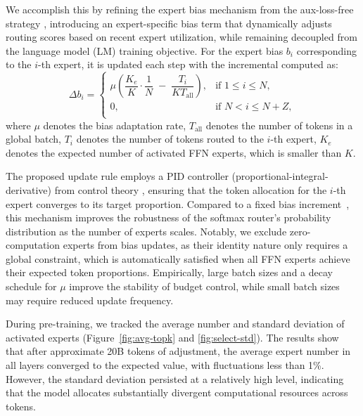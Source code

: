 \documentclass{article}
\begin{document}
We accomplish this by refining the expert bias mechanism from the aux-loss-free strategy \citep{wang2024auxiliary}, introducing an expert-specific bias term that dynamically adjusts routing scores based on recent expert utilization, while remaining decoupled from the language model (LM) training objective. 
For the expert bias $b_i$ corresponding to the $i$-th expert, it is updated each step with the incremental computed as:
\begin{equation}
\label{eq:bias}
    \Delta b_i =
    \begin{cases}
        \mu \left( \dfrac{K_{e}}{K} \cdot \dfrac{1}{N} \;-\; \dfrac{T_i}{KT_{\mathrm{all}}} \right), & \text{if } 1 \leq i \leq N, \\[1.2ex]
        0, & \text{if } N < i \leq N+Z,  \\
    \end{cases}
\end{equation}
where $\mu$ denotes the bias adaptation rate, $T_{\mathrm{all}}$ denotes the  number of tokens in a global batch, $T_i$ denotes the number of tokens routed to the $i$-th expert, $K_{e}$ denotes the expected number of activated FFN experts, which is smaller than $K$.

The proposed update rule employs a PID controller (proportional-integral-derivative) from control theory \citep{control_book}, ensuring that the token allocation for the $i$-th expert converges to its target proportion. Compared to a fixed bias increment~\citep{wang2024auxiliary}, this mechanism improves the robustness of the softmax router's probability distribution as the number of experts scales. Notably, we exclude zero-computation experts from bias updates, as their identity nature only requires a global constraint, which is automatically satisfied when all FFN experts achieve their expected token proportions. Empirically, large batch sizes and a decay schedule for $\mu$ improve the stability of budget control, while small batch sizes may require reduced update frequency.

During pre-training, we tracked the average number and standard deviation of activated experts (Figure~\ref{fig:avg-topk} and \ref{fig:select-std}). The results show that after approximate 20B tokens of adjustment, the average expert number in all layers converged to the expected value, with fluctuations less than 1\%.
However, the standard deviation persisted at a relatively high level, indicating that the model allocates substantially divergent computational resources across tokens.
\end{document}
